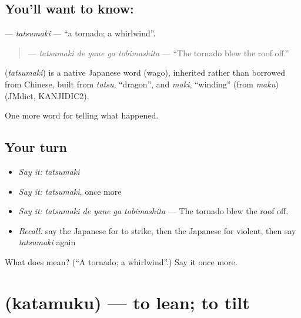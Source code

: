 \subsection*{You'll want to know: }
\textbf{} — \emph{tatsumaki} — \textquotedblleft{}a tornado; a whirlwind\textquotedblright{}.

\begin{quote}
\textbf{  } — \emph{tatsumaki de yane ga tobimashita} — \textquotedblleft{}The tornado blew the roof off.\textquotedblright{}
\end{quote}

\begin{cousinweb}
\textbf{} (\emph{tatsumaki}) is a native Japanese word (wago), inherited rather than borrowed from Chinese, built from \emph{tatsu}, \textquotedblleft{}dragon\textquotedblright{}, and \emph{maki}, \textquotedblleft{}winding\textquotedblright{} (from \emph{maku}) (JMdict, KANJIDIC2).
\end{cousinweb}

\begin{grammarlens}[title={What you've built}]
One more word for telling what happened.
\end{grammarlens}

\subsection*{Your turn}
\begin{itemize}
\raggedright
  \item \emph{Say it:} \emph{tatsumaki}
  \item \emph{Say it:} \emph{tatsumaki}, once more
  \item \emph{Say it:} \emph{tatsumaki de yane ga tobimashita} — The tornado blew the roof off.
  \item \emph{Recall:} say the Japanese for to strike, then the Japanese for violent, then say \emph{tatsumaki} again
\end{itemize}

\begin{tcolorbox}[breakable,colback=teal!4,colframe=teal!35!black,title={Before you move on}]
What does  mean? (\textquotedblleft{}A tornado; a whirlwind\textquotedblright{}.) Say it once more.
\end{tcolorbox}
\section[\texorpdfstring{\ja{かたむく} (katamuku)}{かたむく (katamuku)}]{ (katamuku) — to lean; to tilt}

